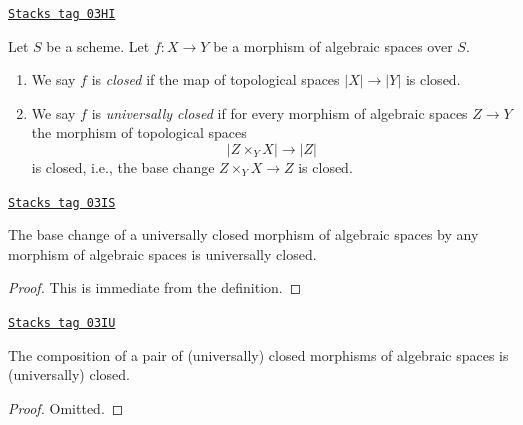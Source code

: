 \begin{definition}[Closed]
\label{spaces-morphisms-definition-closed}
\href{https://stacks.math.columbia.edu/tag/03HI}{\texttt{Stacks tag 03HI}}

Let $S$ be a scheme. Let $f : X \to Y$ be a morphism of algebraic spaces
over $S$.
\begin{enumerate}
\item We say $f$ is {\it closed} if the map of topological
spaces $|X| \to |Y|$ is closed.
\item We say $f$ is {\it universally closed} if for every morphism
of algebraic spaces $Z \to Y$ the morphism of topological spaces
$$
|Z \times_Y X| \to |Z|
$$
is closed, i.e., the base change $Z \times_Y X \to Z$ is closed.
\end{enumerate}
\end{definition}

\begin{lemma}
\label{spaces-morphisms-lemma-base-change-universally-closed}
\href{https://stacks.math.columbia.edu/tag/03IS}{\texttt{Stacks tag 03IS}}

The base change of a universally closed morphism of algebraic spaces
by any morphism of algebraic spaces is universally closed.
\end{lemma}

\begin{proof}
This is immediate from the definition.
\end{proof}

\begin{lemma}
\label{spaces-morphisms-lemma-composition-universally-closed}
\href{https://stacks.math.columbia.edu/tag/03IU}{\texttt{Stacks tag 03IU}}

The composition of a pair of (universally) closed morphisms of algebraic spaces
is (universally) closed.
\end{lemma}

\begin{proof}
Omitted.
\end{proof}

